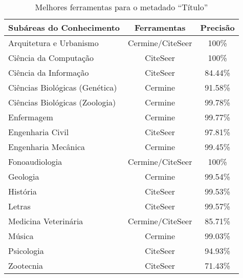 \begin{table}
    \caption{Melhores ferramentas para o metadado ``Título''}
    \begin{center}
        \begin{tabular}{|l|c|c|}
            \hline 
            \textbf{Subáreas do Conhecimento} & \textbf{Ferramentas} & \textbf{Precisão} \\ 
            \hline 
            Arquitetura e Urbanismo & Cermine/CiteSeer & 100\% \\ \hline
            Ciência da Computação & CiteSeer & 100\% \\ \hline
            Ciência da Informação & CiteSeer & 84.44\% \\ \hline
            Ciências Biológicas (Genética) & Cermine & 91.58\% \\ \hline
            Ciências Biológicas (Zoologia) & Cermine & 99.78\% \\ \hline
            Enfermagem & Cermine & 99.77\% \\ \hline
            Engenharia Civil & CiteSeer & 97.81\% \\ \hline
            Engenharia Mecânica & Cermine & 99.45\% \\ \hline
            Fonoaudiologia & Cermine/CiteSeer & 100\% \\ \hline
            Geologia & Cermine & 99.54\% \\ \hline
            História & CiteSeer & 99.53\% \\ \hline
            Letras & CiteSeer & 99.57\% \\ \hline
            Medicina Veterinária & Cermine/CiteSeer & 85.71\% \\ \hline
            Música & Cermine & 99.03\% \\ \hline
            Psicologia & CiteSeer & 94.93\% \\ \hline
            Zootecnia & CiteSeer & 71.43\% \\ \hline
        \end{tabular}
    \end{center}
    \label{tab:areas-title-tools}
\end{table}


